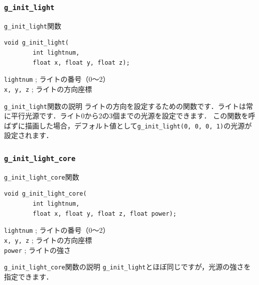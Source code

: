 \documentclass[platex,a4paper,12pt]{jsarticle}%
\begin{document}
\clearpage
\subsubsection{\texttt{g\_init\_light}}

\begin{itembox}[l]{\texttt{g\_init\_light}関数}
\begin{verbatim}
void g_init_light(
        int lightnum,
        float x, float y, float z);
\end{verbatim}
\verb|lightnum| ; ライトの番号（0〜2）\\
\verb|x, y, z| ; ライトの方向座標
\end{itembox}

\begin{itembox}[l]{\texttt{g\_init\_light}関数の説明}
ライトの方向を設定するための関数です．ライトは常に平行光源です．ライト0から2の3個までの光源を設定できます．
この関数を呼ばずに描画した場合，デフォルト値として\texttt{g\_init\_light(0, 0, 0, 1)}の光源が設定されます．
\end{itembox}

\subsubsection{\texttt{g\_init\_light\_core}}

\begin{itembox}[l]{\texttt{g\_init\_light\_core}関数}
\begin{verbatim}
void g_init_light_core(
        int lightnum,
        float x, float y, float z, float power);
\end{verbatim}
\verb|lightnum| ; ライトの番号（0〜2）\\
\verb|x, y, z| ; ライトの方向座標\\
\verb|power| ; ライトの強さ
\end{itembox}

\begin{itembox}[l]{\texttt{g\_init\_light\_core}関数の説明}
\texttt{g\_init\_light}とほぼ同じですが，光源の強さを指定できます．
\end{itembox}
\end{document}
